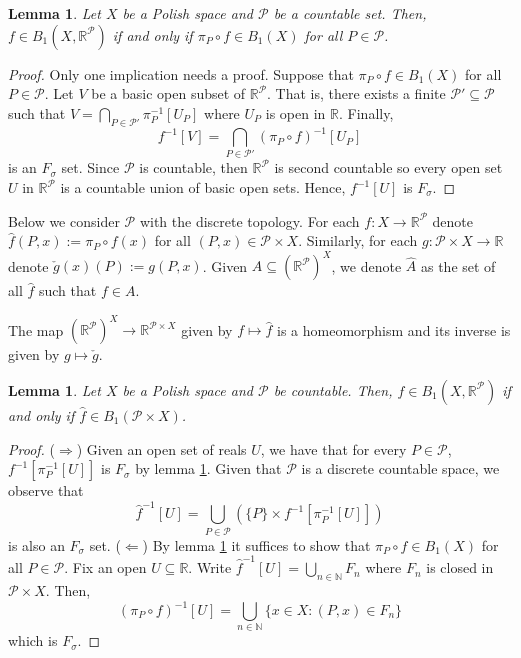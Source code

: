 \documentclass[psamsfonts]{amsart}
\newtheorem{lem}[thm]{Lemma}
\theoremstyle{definition}
\theoremstyle{remark}
\numberwithin{equation}{section}
\begin{document}
\begin{lem}\label{baire 1 and projections}
    Let $X$ be a Polish space and $\mathcal{P}$ be a countable set. Then, $f\in B_1(X,\mathbb{R}^\mathcal{P})$ if and only if $\pi_P\circ f\in B_1(X)$ for all $P\in\mathcal{P}$.
\end{lem}

\begin{proof}
    Only one implication needs a proof. Suppose that $\pi_P\circ f\in B_1(X)$ for all $P\in\mathcal{P}$. Let $V$ be a basic open subset of $\mathbb{R}^\mathcal{P}$. That is, there exists a finite $\mathcal{P}'\subseteq\mathcal{P}$ such that $V=\bigcap_{P\in\mathcal{P}'}\pi_P^{-1}[U_P]$ where $U_P$ is open in $\mathbb{R}$. Finally, 
    $$f^{-1}[V]=\bigcap_{P\in\mathcal{P}'}(\pi_P\circ f)^{-1}[U_P]$$ is an $F_\sigma$ set. Since $\mathcal{P}$ is countable, then $\mathbb{R}^\mathcal{P}$ is second countable so every open set $U$ in $\mathbb{R}^\mathcal{P}$ is a countable union of basic open sets. Hence, $f^{-1}[U]$ is $F_\sigma$.
\end{proof}

Below we consider $\mathcal P$ with the discrete topology. For each $f:X\rightarrow\mathbb{R}^\mathcal{P}$ denote $\hat f(P,x):=\pi_P\circ f(x)$ for all $(P,x)\in\mathcal{P}\times X$. Similarly, for each $g:\mathcal{P}\times X\rightarrow\mathbb{R}$ denote $\check g(x)(P):=g(P,x)$. Given $A\subseteq (\mathbb{R}^\mathcal{P})^X$, we denote $\hat A$ as the set of all $\hat f$ such that $f\in A$.

The map $\left(\mathbb R^\mathcal P\right)^X\to\mathbb R^{\mathcal P\times X}$ given by $f\mapsto\hat f$ is a homeomorphism and its inverse is given by $g\mapsto\check g$.

\begin{lem}\label{homeo}
    Let $X$ be a Polish space and $\mathcal{P}$ be countable. Then, $f\in B_1(X,\mathbb R^\mathcal P)$ if and only if $\hat f\in B_1(\mathcal P\times X)$.
\end{lem}

\begin{proof}
    ($\Rightarrow$) Given an open set of reals $U$, we have that for every $P\in\mathcal P$, $f^{-1}[\pi_P^{-1}[U]]$ is $F_\sigma$ by lemma \ref{baire 1 and projections}. Given that $\mathcal P$ is a discrete countable space, we observe that
    $$\hat f^{-1}[U]=\bigcup_{P\in\mathcal P}\left(\{P\}\times f^{-1}[\pi_P^{-1}[U]]\right)
    $$ is also an $F_\sigma$ set.
    ($\Leftarrow$) By lemma \ref{baire 1 and projections} it suffices to show that $\pi_P\circ f\in B_1(X)$ for all $P\in\mathcal{P}$. Fix an open $U\subseteq\mathbb{R}$. Write $\hat{f}^{-1}[U]=\bigcup_{n\in\mathbb{N}}F_n$ where $F_n$ is closed in $\mathcal{P}\times X$. Then,
    $$(\pi_P\circ f)^{-1}[U]=\bigcup_{n\in\mathbb{N}}\{x\in X:(P,x)\in F_n\}$$
    which is $F_\sigma$.
\end{proof}
\end{document}
